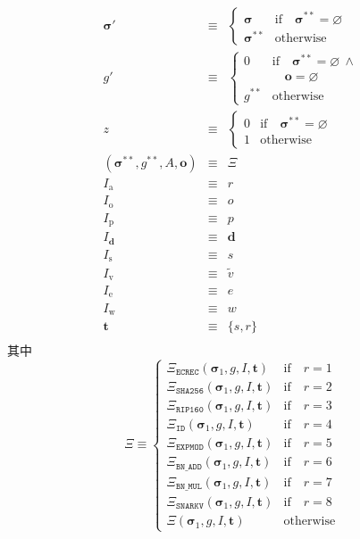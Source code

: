 \documentclass[9pt,oneside]{amsart}
\begin{document}
\begin{multicols}{2}
\begin{eqnarray}
\boldsymbol{\sigma}' & \equiv & \begin{cases}
\boldsymbol{\sigma} & \text{if} \quad \boldsymbol{\sigma}^{**} = \varnothing \\
\boldsymbol{\sigma}^{**} & \text{otherwise}
\end{cases} \\
g' & \equiv & \begin{cases}
0 & \text{if} \quad \boldsymbol{\sigma}^{**} = \varnothing \ \wedge \\
&\quad \mathbf{o} = \varnothing \\
g^{**} & \text{otherwise}
\end{cases} \\ \nonumber
z & \equiv & \begin{cases}
0 & \text{if} \quad \boldsymbol{\sigma}^{**} = \varnothing \\
1 & \text{otherwise}
\end{cases} \\
(\boldsymbol{\sigma}^{**}, g^{**},A, \mathbf{o}) & \equiv & \Xi\\
I_{\mathrm{a}} & \equiv & r \\
I_{\mathrm{o}} & \equiv & o \\
I_{\mathrm{p}} & \equiv & p \\
I_{\mathbf{d}} & \equiv & \mathbf{d} \\
I_{\mathrm{s}} & \equiv & s \\
I_{\mathrm{v}} & \equiv & \tilde{v} \\
I_{\mathrm{e}} & \equiv & e \\
I_{\mathrm{w}} & \equiv & w \\
\mathbf{t} & \equiv & \{s, r\} \\
\end{eqnarray}
\nopagebreak[1]其中
\begin{equation}
\Xi \equiv \begin{cases}
\Xi_{\mathtt{ECREC}}(\boldsymbol{\sigma}_1, g, I, \mathbf{t}) & \text{if} \quad r = 1 \\
\Xi_{\mathtt{SHA256}}(\boldsymbol{\sigma}_1, g, I, \mathbf{t}) & \text{if} \quad r = 2 \\
\Xi_{\mathtt{RIP160}}(\boldsymbol{\sigma}_1, g, I, \mathbf{t}) & \text{if} \quad r = 3 \\
\Xi_{\mathtt{ID}}(\boldsymbol{\sigma}_1, g, I, \mathbf{t}) & \text{if} \quad r = 4 \\
\Xi_{\mathtt{EXPMOD}}(\boldsymbol{\sigma}_1, g, I, \mathbf{t}) & \text{if} \quad r = 5 \\
\Xi_{\mathtt{BN\_ADD}}(\boldsymbol{\sigma}_1, g, I, \mathbf{t}) & \text{if} \quad r = 6 \\
\Xi_{\mathtt{BN\_MUL}}(\boldsymbol{\sigma}_1, g, I, \mathbf{t}) & \text{if} \quad r = 7 \\
\Xi_{\mathtt{SNARKV}}(\boldsymbol{\sigma}_1, g, I, \mathbf{t}) & \text{if} \quad r = 8 \\
\Xi(\boldsymbol{\sigma}_1, g, I, \mathbf{t}) & \text{otherwise} \end{cases}
\end{equation}


\end{multicols}
\end{document}
